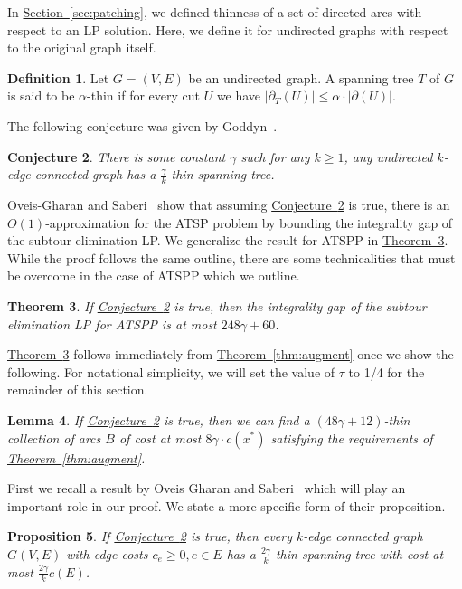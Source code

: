 \documentclass[11pt]{article}
\newcommand{\lref}[2][]{\hyperref[#2]{#1~\ref*{#2}}}
\newtheorem{theorem}{Theorem}[section]
\newtheorem{proposition}[theorem]{Proposition}
\newtheorem{lemma}[theorem]{Lemma}
\newtheorem{conjecture}[theorem]{Conjecture}
\theoremstyle{definition}
\newtheorem{definition}[theorem]{Definition}
\def\A{{B}}
\begin{document}
In \lref[Section]{sec:patching}, we defined thinness of a set of directed arcs with respect to an LP solution. Here, we define it for undirected graphs
with respect to the original graph itself.
\begin{definition}
Let $G = (V,E)$ be an undirected graph. A spanning tree $T$ of $G$ is said to be $\alpha$-thin if for every cut $U$
we have $|\partial_{T}(U)| \leq \alpha \cdot |\partial(U)|$.
\end{definition}

The following conjecture was given by Goddyn~\cite{goddyn}.
\begin{conjecture}\label{conj:thin}
There is some constant $\gamma$ such for any $k \geq 1$, any undirected $k$-edge connected graph has a $\frac{\gamma}{k}$-thin spanning tree.
\end{conjecture}

Oveis-Gharan and Saberi~\cite{GS11} show that assuming \lref[Conjecture]{conj:thin} is true, there is an $O(1)$-approximation for the ATSP problem by bounding the integrality gap of the subtour elimination LP. We generalize the result for ATSPP in \lref[Theorem]{thm:thin}. While the proof follows the same outline,  there are some technicalities that must be overcome in the case of ATSPP which we outline.

\begin{theorem}\label{thm:thin}
If \lref[Conjecture]{conj:thin} is true, then the integrality gap of the subtour elimination LP for ATSPP is at most $248\gamma + 60$.
\end{theorem}

\lref[Theorem]{thm:thin} follows immediately from \lref[Theorem]{thm:augment} once we show the following. For notational simplicity, we will set the value of $\tau$ to 1/4 for the remainder of this section.

\begin{lemma}\label{lem:thin}
If \lref[Conjecture]{conj:thin} is true, then we can find a $(48\gamma + 12)$-thin collection of arcs $\A$ of cost at most $8\gamma \cdot c(x^*)$ satisfying the
requirements of \lref[Theorem]{thm:augment}.
\end{lemma}

First we recall a result by Oveis Gharan and Saberi~\cite{GS11} which will play an important role in our proof. We state a more specific
form of their proposition.
\begin{proposition}{\cite{GS11}}\label{prop:thintree}
If \lref[Conjecture]{conj:thin} is true, then every $k$-edge connected graph $G(V,E)$ with edge costs $c_e \geq 0, e \in E$ has a
$\frac{2\gamma}{k}$-thin spanning tree with cost at most $\frac{2\gamma}{k} c(E)$.
\end{proposition}
\end{document}
